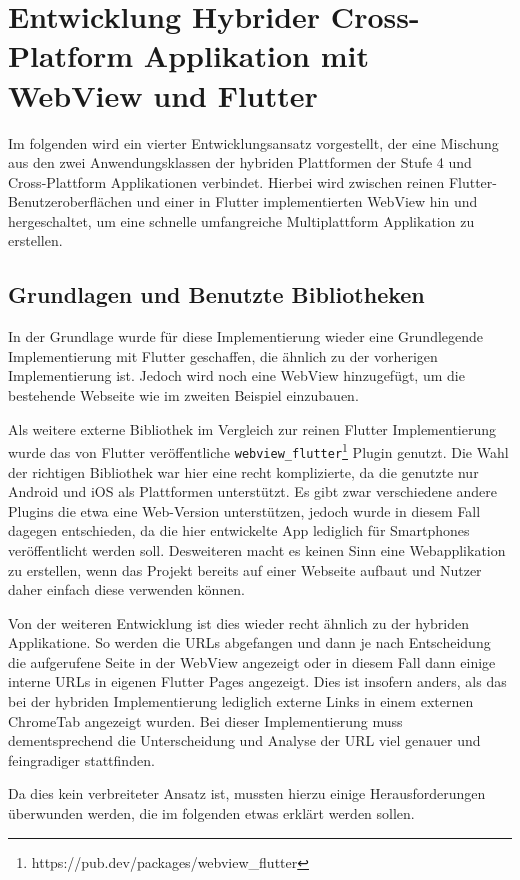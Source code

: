 \section{Entwicklung Hybrider Cross-Platform Applikation mit WebView und Flutter}
Im folgenden wird ein vierter Entwicklungsansatz vorgestellt, der eine Mischung aus den zwei Anwendungsklassen der hybriden Plattformen der Stufe 4 und Cross-Plattform Applikationen verbindet. Hierbei wird zwischen reinen Flutter-Benutzeroberflächen und einer in Flutter implementierten WebView hin und hergeschaltet, um eine schnelle umfangreiche Multiplattform Applikation zu erstellen.

\subsection{Grundlagen und Benutzte Bibliotheken}
In der Grundlage wurde für diese Implementierung wieder eine Grundlegende Implementierung mit Flutter geschaffen, die ähnlich zu der vorherigen Implementierung ist. Jedoch wird noch eine WebView hinzugefügt, um die bestehende Webseite wie im zweiten Beispiel einzubauen.  

Als weitere externe Bibliothek im Vergleich zur reinen Flutter Implementierung wurde das von Flutter veröffentliche \verb|webview_flutter|\footnote{https://pub.dev/packages/webview\_flutter} Plugin genutzt. Die Wahl der richtigen Bibliothek war hier eine recht komplizierte, da die genutzte nur Android und iOS als Plattformen unterstützt. Es gibt zwar verschiedene andere Plugins die etwa eine Web-Version unterstützen, jedoch wurde in diesem Fall dagegen entschieden, da die hier entwickelte App lediglich für Smartphones veröffentlicht werden soll. Desweiteren macht es keinen Sinn eine Webapplikation zu erstellen, wenn das Projekt bereits auf einer Webseite aufbaut und Nutzer daher einfach diese verwenden können.

Von der weiteren Entwicklung ist dies wieder recht ähnlich zu der hybriden Applikatione. So werden die URLs abgefangen und dann je nach Entscheidung die aufgerufene Seite in der WebView angezeigt oder in diesem Fall dann einige interne URLs in eigenen Flutter Pages angezeigt. Dies ist insofern anders, als das bei der hybriden Implementierung lediglich externe Links in einem externen ChromeTab angezeigt wurden. Bei dieser Implementierung muss dementsprechend die Unterscheidung und Analyse der URL viel genauer und feingradiger stattfinden.


Da dies kein verbreiteter Ansatz ist, mussten hierzu einige Herausforderungen überwunden werden, die im folgenden etwas erklärt werden sollen. 

